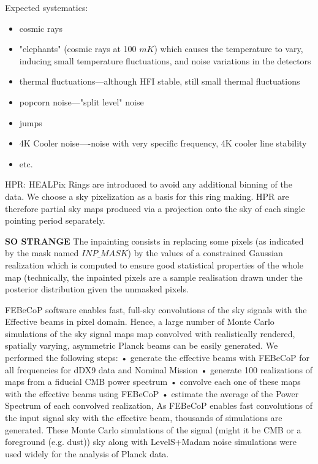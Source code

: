 \documentclass[a4paper, 11pt]{article}
\begin{document}
Expected systematics: \begin{itemize}

\item cosmic rays

\item"elephants" (cosmic rays at 100 $mK$) which causes the temperature to vary, inducing small temperature fluctuations, and noise variations in the detectors

\item thermal fluctuations---although HFI stable, still small thermal fluctuations

\item popcorn noise---"split level" noise

\item jumps

\item 4K Cooler noise----noise with very specific frequency, 4K cooler line stability

\item etc.
 
\end{itemize}

HPR: HEALPix Rings are introduced to avoid any additional binning of the data. We choose a
sky pixelization as a basis for this ring making. HPR are therefore partial sky maps produced via a projection onto the sky of each single pointing period separately.


\textbf{SO STRANGE}
The inpainting consists in replacing some pixels (as indicated by the mask named $INP\_MASK$) by the values of a constrained Gaussian realization which is computed to ensure good statistical properties of the whole map (technically, the inpainted pixels are a sample realisation drawn under the posterior distribution given the unmasked pixels. 


FEBeCoP software enables fast, full-sky convolutions of the sky signals with the Effective beams in pixel domain. Hence, a large number of Monte Carlo simulations of the sky signal maps map convolved with realistically rendered, spatially varying, asymmetric Planck beams can be easily generated. We performed the following steps:
• generate the effective beams with FEBeCoP for all frequencies for dDX9 data and Nominal Mission
• generate 100 realizations of maps from a fiducial CMB power spectrum
• convolve each one of these maps with the effective beams using FEBeCoP
• estimate the average of the Power Spectrum of each convolved realization, %
As FEBeCoP enables fast convolutions of the input signal sky with the effective beam, thousands of simulations are generated. These Monte Carlo simulations of the signal (might it be CMB or a foreground (e.g. dust)) sky along with LevelS+Madam noise simulations were used widely for the analysis of Planck data. 
\end{document}
